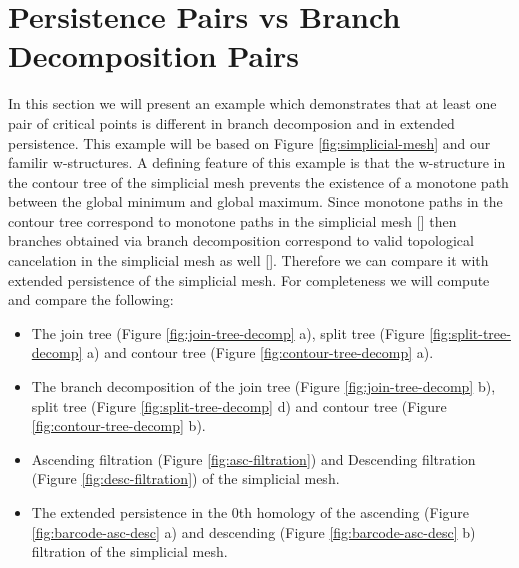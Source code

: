 \section{Persistence Pairs vs Branch Decomposition Pairs}

In this section we will present an example which demonstrates that at least one pair of critical points is different in branch decomposion and in extended persistence. This example will be based on Figure \ref{fig:simplicial-mesh} and our familir w-structures. A defining feature of this example is that the w-structure in the contour tree of the simplicial mesh prevents the existence of a monotone path between the global minimum and global maximum. Since monotone paths in the contour tree correspond to monotone paths in the simplicial mesh [] then branches obtained via branch decomposition correspond to valid topological cancelation in the simplicial mesh as well []. Therefore we can compare it with extended persistence of the simplicial mesh. For completeness we will compute and compare the following:

\begin{itemize}

    \item The join tree (Figure \ref{fig:join-tree-decomp} a), split tree (Figure \ref{fig:split-tree-decomp} a) and contour tree (Figure \ref{fig:contour-tree-decomp} a).

    \item The branch decomposition of the join tree (Figure \ref{fig:join-tree-decomp} b), split tree (Figure \ref{fig:split-tree-decomp} d) and contour tree (Figure \ref{fig:contour-tree-decomp} b).

    \item Ascending filtration (Figure \ref{fig:asc-filtration}) and Descending filtration (Figure \ref{fig:desc-filtration}) of the simplicial mesh.


    \item The extended persistence in the 0th homology of the ascending (Figure \ref{fig:barcode-asc-desc} a) and descending (Figure \ref{fig:barcode-asc-desc} b) filtration of the simplicial mesh.


\end{itemize}

